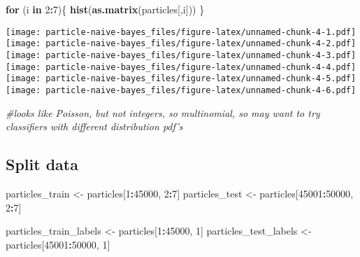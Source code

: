 \documentclass[
]{article}
\newenvironment{Shaded}{\begin{snugshade}}{\end{snugshade}}
\newcommand{\CommentTok}[1]{\textcolor[rgb]{0.56,0.35,0.01}{\textit{#1}}}
\newcommand{\ControlFlowTok}[1]{\textcolor[rgb]{0.13,0.29,0.53}{\textbf{#1}}}
\newcommand{\DecValTok}[1]{\textcolor[rgb]{0.00,0.00,0.81}{#1}}
\newcommand{\KeywordTok}[1]{\textcolor[rgb]{0.13,0.29,0.53}{\textbf{#1}}}
\newcommand{\NormalTok}[1]{#1}
\newcommand{\OperatorTok}[1]{\textcolor[rgb]{0.81,0.36,0.00}{\textbf{#1}}}
\newcommand{\StringTok}[1]{\textcolor[rgb]{0.31,0.60,0.02}{#1}}
\begin{document}
\begin{Shaded}
\begin{Highlighting}[]
\ControlFlowTok{for}\NormalTok{ (i }\ControlFlowTok{in} \DecValTok{2}\OperatorTok{:}\DecValTok{7}\NormalTok{)\{}
  \KeywordTok{hist}\NormalTok{(}\KeywordTok{as.matrix}\NormalTok{(particles[,i]))}
\NormalTok{\}}
\end{Highlighting}
\end{Shaded}

\texttt{[image: particle-naive-bayes\_files/figure-latex/unnamed-chunk-4-1.pdf]}
\texttt{[image: particle-naive-bayes\_files/figure-latex/unnamed-chunk-4-2.pdf]}
\texttt{[image: particle-naive-bayes\_files/figure-latex/unnamed-chunk-4-3.pdf]}
\texttt{[image: particle-naive-bayes\_files/figure-latex/unnamed-chunk-4-4.pdf]}
\texttt{[image: particle-naive-bayes\_files/figure-latex/unnamed-chunk-4-5.pdf]}
\texttt{[image: particle-naive-bayes\_files/figure-latex/unnamed-chunk-4-6.pdf]}

\begin{Shaded}
\begin{Highlighting}[]
\CommentTok{#looks like Poisson, but not integers, so multinomial, so may want to try classifiers with different distribution pdf's}
\end{Highlighting}
\end{Shaded}

\hypertarget{split-data}{%
\subsection{Split data}\label{split-data}}

\begin{Shaded}
\begin{Highlighting}[]
\NormalTok{particles_train <-}\StringTok{ }\NormalTok{particles[}\DecValTok{1}\OperatorTok{:}\DecValTok{45000}\NormalTok{, }\DecValTok{2}\OperatorTok{:}\DecValTok{7}\NormalTok{]}
\NormalTok{particles_test <-}\StringTok{ }\NormalTok{particles[}\DecValTok{45001}\OperatorTok{:}\DecValTok{50000}\NormalTok{, }\DecValTok{2}\OperatorTok{:}\DecValTok{7}\NormalTok{]}

\NormalTok{particles_train_labels <-}\StringTok{ }\NormalTok{particles[}\DecValTok{1}\OperatorTok{:}\DecValTok{45000}\NormalTok{, }\DecValTok{1}\NormalTok{]}
\NormalTok{particles_test_labels <-}\StringTok{ }\NormalTok{particles[}\DecValTok{45001}\OperatorTok{:}\DecValTok{50000}\NormalTok{, }\DecValTok{1}\NormalTok{]}
\end{Highlighting}
\end{Shaded}
\end{document}
